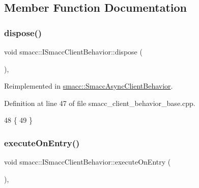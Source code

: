 \subsection{Member Function Documentation}
\mbox{\label{classsmacc_1_1ISmaccClientBehavior_abdc74a8d95fdd02794c19dfa90f8a6ce}} 
\subsubsection{\texorpdfstring{dispose()}{dispose()}}
{\footnotesize\ttfamily void smacc\+::\+I\+Smacc\+Client\+Behavior\+::dispose (\begin{DoxyParamCaption}{ }\end{DoxyParamCaption})\hspace{0.3cm}{\ttfamily [protected]}, {\ttfamily [virtual]}}



Reimplemented in \hyperlink{classsmacc_1_1SmaccAsyncClientBehavior_af475cee853947a8d3f513c7fb9789e7a}{smacc\+::\+Smacc\+Async\+Client\+Behavior}.



Definition at line 47 of file smacc\+\_\+client\+\_\+behavior\+\_\+base.\+cpp.


\begin{DoxyCode}
48 \{
49 \}
\end{DoxyCode}
\mbox{\label{classsmacc_1_1ISmaccClientBehavior_a90b7032f7520f9e7e805835e6ed9d43e}} 
\subsubsection{\texorpdfstring{execute\+On\+Entry()}{executeOnEntry()}}
{\footnotesize\ttfamily void smacc\+::\+I\+Smacc\+Client\+Behavior\+::execute\+On\+Entry (\begin{DoxyParamCaption}{ }\end{DoxyParamCaption})\hspace{0.3cm}{\ttfamily [protected]}, {\ttfamily [virtual]}}



